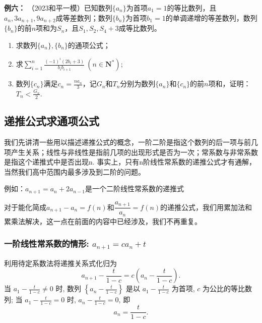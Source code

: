\documentclass{article}
\begin{document}
\noindent\textbf{例六： }（2023和平一模）已知数列$\{a_n\}$为首项$a_1=1$的等比数列，且$a_n,3a_{n+1},9a_{n+2}$成等差数列；数列$\{b_n\}$为首项$b_1=1$的单调递增的等差数列，数列$\{b_n\}$的前$n$项和为$S_n$，且$S_1,S_2,S_4+3$成等比数列。

\begin{enumerate}[label=(\Roman*)]
    \item 求数列$\{a_n\},\{b_n\}$的通项公式；
    
    \item 求$\displaystyle\sum_{i=1}^n \frac{(-1)^i(2b_i+3)}{b_i b_{i+1}}\ (n\in\mathbf{N}^*)$;
    
    \item 数列$\{c_n\}$满足$c_n=\frac{na_n}{3}$，记$G_n$和$T_n$分别为数列$\{a_n\}$和$\{c_n\}$的前$n$项和，证明：$T_n<\frac{G_n}{2}$.
\end{enumerate}

\newpage


\subsection{递推公式求通项公式}

\begin{tcolorbox}[colback=blue!10,colframe=blue!70!black,title=]
    我们先讲清一些用以描述递推公式的概念，一阶二阶是指这个数列的后一项与前几项产生关系；线性与非线性是指前几项的出现形式是否为一次；常系数与非常系数是指这个递推式中是否出现n.
    事实上，只有n阶线性常系数的递推公式才有通解，当然我们高中范围内最多涉及到二阶的问题。

例如：$a_{n+1}=a_n+2a_{n-1}$是一个二阶线性常系数的递推式

\end{tcolorbox}

对于能化简成$a_{n+1} - a_n = f(n)$和$\dfrac{a_{n+1}}{a_n} = f(n)$的递推公式，我们用累加法和累乘法解决，这一点在前面的内容中已经涉及，我们不再重复。

\subsubsection{一阶线性常系数的情形: $a_{n+1}=ca_n+t$}

利用待定系数法将递推关系式化归为
\[
a_{n+1} - \frac{t}{1-c} = c\left(a_n - \frac{t}{1-c}\right).
\]
当 \(a_1 - \frac{t}{1-c} \neq 0\) 时, 数列 \(\left\{a_n - \frac{t}{1-c}\right\}\) 是以 \(a_1 - \frac{t}{1-c}\) 为首项, \(c\) 为公比的等比数列; 当 \(a_1 - \frac{t}{1-c} = 0\) 时, \(a_n - \frac{t}{1-c} = 0\), 即
\[
a_n = \frac{t}{1-c}.
\]
\end{document}
